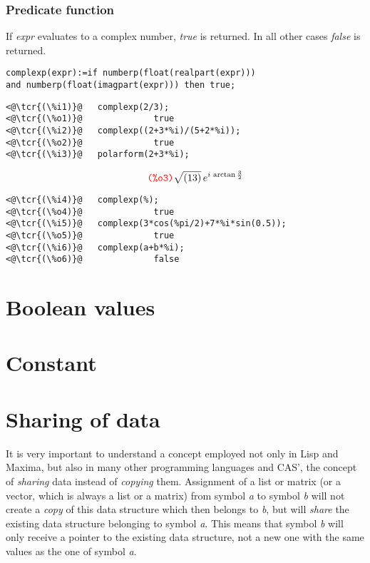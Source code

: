 \documentclass[../Maxima_Workbook.tex]{subfiles}
\begin{document}
\subsubsection{Predicate function}

\lzz {} \hfill {}

\lz If \emph{expr} evaluates to a complex number, \emph{true} is returned. In all other cases \emph{false} is returned.

\begin{lstlisting}
complexp(expr):=if numberp(float(realpart(expr))) 
and numberp(float(imagpart(expr))) then true;
\end{lstlisting}

\begin{small}
\color{blue} \leqn
\begin{lstlisting}
<@\tcr{(\%i1)}@   complexp(2/3);
<@\tcr{(\%o1)}@			     true
<@\tcr{(\%i2)}@   complexp((2+3*%i)/(5+2*%i));
<@\tcr{(\%o2)}@			     true
<@\tcr{(\%i3)}@   polarform(2+3*%i);
\end{lstlisting}
\vspace{-4mm} \[\tag*{\tcr{\ttfamily (\%o3)}} \sqrt{(13)} \, e^{i \, \arctan \frac{3}{2}} \]
\vspace{-8mm} \begin{lstlisting}
<@\tcr{(\%i4)}@   complexp(%);
<@\tcr{(\%o4)}@			     true
<@\tcr{(\%i5)}@   complexp(3*cos(%pi/2)+7*%i*sin(0.5));
<@\tcr{(\%o5)}@			     true
<@\tcr{(\%i6)}@   complexp(a+b*%i);
<@\tcr{(\%o6)}@			     false
\end{lstlisting}
\color{black} \reqn
\end{small}

\section{Boolean values}

\section{Constant}

\section{Sharing of data}

It is very important to understand a concept  employed not only in Lisp and Maxima, but also in many other programming languages and CAS', the concept of \emph{sharing} data instead of \emph{copying} them. Assignment of a list or matrix (or a vector, which is always a list or a matrix) from symbol \emph{a} to symbol \emph{b} will not create a \emph{copy} of this data structure which then belongs to \emph{b}, but will \emph{share} the existing data structure belonging to symbol \emph{a}. This means that symbol \emph{b} will only receive a pointer to the existing data structure, not a new one with the same values as the one of symbol \emph{a}.
\end{document}
